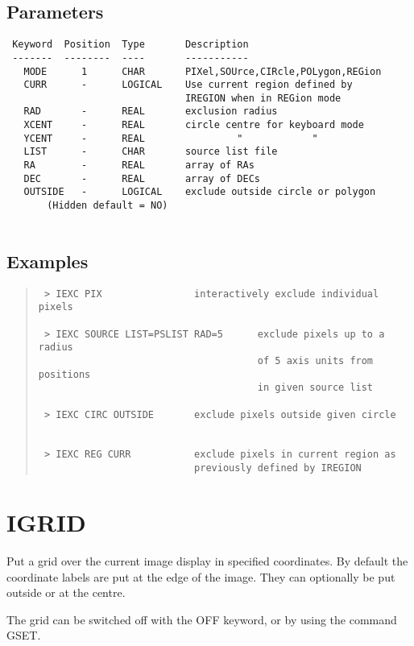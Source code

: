 \documentclass{book}
\renewcommand{\_}{{\tt\char'137}}     %
\begin{document}
\subsection{Parameters}
\begin{verbatim}
 Keyword  Position  Type       Description
 -------  --------  ----       -----------
   MODE      1      CHAR       PIXel,SOUrce,CIRcle,POLygon,REGion
   CURR      -      LOGICAL    Use current region defined by
                               IREGION when in REGion mode
   RAD       -      REAL       exclusion radius
   XCENT     -      REAL       circle centre for keyboard mode
   YCENT     -      REAL                "            "
   LIST      -      CHAR       source list file
   RA        -      REAL       array of RAs
   DEC       -      REAL       array of DECs
   OUTSIDE   -      LOGICAL    exclude outside circle or polygon
       (Hidden default = NO)
 
\end{verbatim}\subsection{Examples}
\begin{quote}\begin{verbatim}
 > IEXC PIX                interactively exclude individual pixels
 
 > IEXC SOURCE LIST=PSLIST RAD=5      exclude pixels up to a radius
                                      of 5 axis units from positions
                                      in given source list
 
 > IEXC CIRC OUTSIDE       exclude pixels outside given circle
 
 
 > IEXC REG CURR           exclude pixels in current region as
                           previously defined by IREGION
 \end{verbatim}\end{quote}
\section{IGRID}
Put a grid over the current image display in specified coordinates.
By default the coordinate labels are put at the edge of the image.
They can optionally be put outside or at the centre.
 
The grid can be switched off with the OFF keyword, or by using
the command GSET.
 
\end{document}
